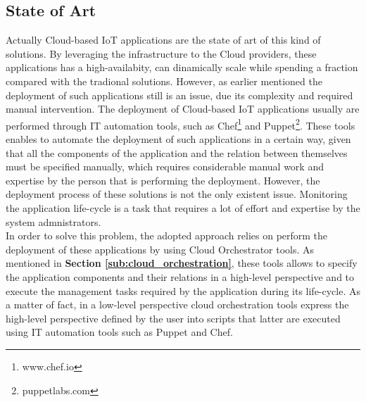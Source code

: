 \subsection{State of Art}
\label{sub:state_of_art}
Actually Cloud-based IoT applications are the state of art of this kind of solutions. By leveraging the infrastructure to the Cloud providers, these applications has a high-availabity, can dinamically scale
while spending a fraction compared with the tradional solutions. However, as earlier mentioned the deployment of such applications still is an issue, due its complexity and required manual intervention. The
deployment of Cloud-based IoT applications usually are performed through IT automation tools, such as Chef\footnote{www.chef.io} and Puppet\footnote{puppetlabs.com}. These tools enables to automate the deployment
of such applications in a certain way, given that all the components of the application and the relation between themselves must be specified manually, which requires considerable manual work and expertise by
the person that is performing the deployment. However, the deployment process of these solutions is not the only existent issue. Monitoring the application life-cycle is a task that requires a lot of effort and expertise
by the system admnistrators.\\

In order to solve this problem, the adopted approach relies on perform the deployment of these applications by using Cloud Orchestrator tools. As mentioned in \textbf{Section \ref{sub:cloud_orchestration}}, these
tools allows to specify the application components and their relations in a high-level perspective and to execute the management tasks required by the application during its life-cycle.
As a matter of fact, in a low-level perspective cloud orchestration tools express the high-level perspective defined by the user into scripts that latter are executed using IT automation tools such as Puppet and Chef.
